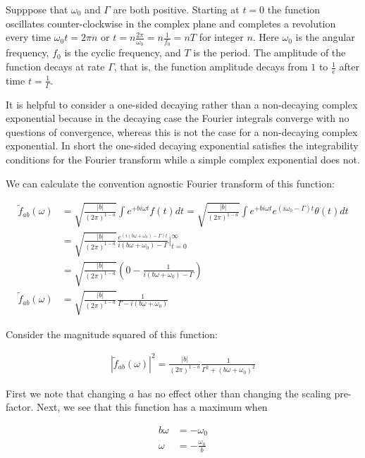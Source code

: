 \documentclass[12pt]{article}
\begin{document}
Supppose that $\omega_0$ and $\Gamma$ are both positive.
Starting at $t=0$ the function oscillates counter-clockwise in the complex plane and completes a revolution every time $\omega_0 t = 2\pi n$ or $t = n \frac{2\pi}{\omega_0} = n \frac{1}{f_0}=nT$ for integer $n$. Here $\omega_0$ is the angular frequency, $f_0$ is the cyclic frequency, and $T$ is the period. The amplitude of the function decays at rate $\Gamma$, that is, the function amplitude decays from $1$ to $\frac{1}{e}$ after time $t = \frac{1}{\Gamma}$. 

It is helpful to consider a one-sided decaying rather than a non-decaying complex exponential because in the decaying case the Fourier integrals converge with no questions of convergence, whereas this is not the case for a non-decaying complex exponential. In short the one-sided decaying exponential satisfies the integrability conditions for the Fourier transform while a simple complex exponential does not.

We can calculate the convention agnostic Fourier transform of this function:

\begin{align}
\tilde{f}_{ab}(\omega) &= \sqrt{\frac{|b|}{(2\pi)^{1-a}}}\int e^{+bi\omega t} f(t) dt = \sqrt{\frac{|b|}{(2\pi)^{1-a}}}\int e^{+bi\omega t} e^{\left(i\omega_0 - \Gamma\right)t} \theta(t) dt\\
&= \sqrt{\frac{|b|}{(2\pi)^{1-a}}} \frac{e^{(i(b\omega + \omega_0) - \Gamma)t}}{i(b\omega + \omega_0) - \Gamma}\Bigg|_{t=0}^{\infty}\\
&= \sqrt{\frac{|b|}{(2\pi)^{1-a}}} \left(0-\frac{1}{i(b\omega +\omega_0) - \Gamma} \right)\\
\tilde{f}_{ab}(\omega) &= \sqrt{\frac{|b|}{(2\pi)^{1-a}}} \frac{1}{\Gamma - i (b\omega + \omega_0)}
\end{align}

Consider the magnitude squared of this function:

\begin{align}
|\tilde{f}_{ab}(\omega)|^2 = \frac{|b|}{(2\pi)^{1-a}} \frac{1}{\Gamma^2 + (b\omega +\omega_0)^2}
\end{align}

First we note that changing $a$ has no effect other than changing the scaling pre-factor. Next, we see that this function has a maximum when 

\begin{align}
b\omega &= -\omega_0\\
\omega &= -\frac{\omega_0}{b}
\end{align}
\end{document}
